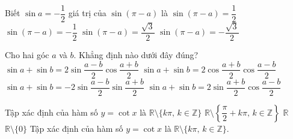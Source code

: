 \begin{ex}%
Biết $\sin a=-\dfrac{1}{2}$ giá trị của $\sin (\pi -a)$ là
\choice
{$\sin (\pi -a)=\dfrac{1}{2}$}
{\True $\sin (\pi -a)=-\dfrac{1}{2}$}
{$\sin (\pi -a)=\dfrac{\sqrt{3}}{2}$}
{$\sin (\pi -a)=-\dfrac{\sqrt{3}}{2}$}
\end{ex}

\begin{ex}%
Cho hai góc $a$ và $b$. Khẳng định nào dưới đây đúng?
\choice
{$\sin a+\sin b=2\sin\dfrac{a-b}{2}\cos\dfrac{a+b}{2}$}
{$\sin a+\sin b=2\cos\dfrac{a+b}{2}\cos\dfrac{a-b}{2}$}
{$\sin a+\sin b=-2\sin\dfrac{a-b}{2}\sin\dfrac{a+b}{2}$}
{\True $\sin a+\sin b=2\sin\dfrac{a+b}{2}\cos\dfrac{a-b}{2}$}
\end{ex}

\begin{ex}%
Tập xác định của hàm số $y=\cot x$ là
\choice
{\True $\mathbb{R} \setminus \{k\pi, \, k\in \mathbb{Z}\}$}
{$\mathbb{R} \setminus \left\{\dfrac{\pi}{2}+k\pi, \, k\in \mathbb{Z}\right\}$}
{$\mathbb{R}$}
{$\mathbb{R} \setminus \{0\}$}
\loigiai
{
Tập xác định của hàm số $y=\cot x$ là $\mathbb{R} \setminus \{k\pi, \, k\in \mathbb{Z}\}$.
}
\end{ex}

